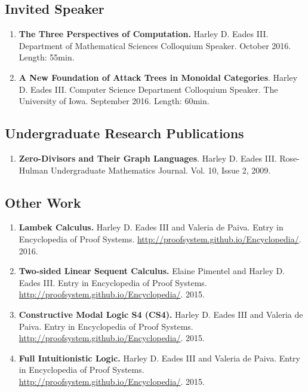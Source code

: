 \documentclass{article}
\begin{document}
    \subsection{Invited Speaker}
    \label{subsec:invited_speaker}
    \begin{enumerate}
    \item \textbf{The Three Perspectives of Computation.} Harley
      D. Eades III. Department of Mathematical Sciences Colloquium
      Speaker. October 2016. Length: 55min.
      
    \item \textbf{A New Foundation of Attack Trees in Monoidal
      Categories}. Harley D. Eades III. Computer Science Department
      Colloquium Speaker.  The University of Iowa. September
      2016. Length: 60min.      
    \end{enumerate}
    
    \subsection{Undergraduate Research Publications}
    \begin{enumerate}
      \item   \textbf{Zero-Divisors and Their Graph Languages}. Harley D. Eades III. Rose-Hulman Undergraduate 
        Mathematics Journal. Vol. 10, Issue 2, 2009. 
    \end{enumerate}

    \subsection{Other Work}
    \label{subsec:other_work}
    \begin{enumerate}
    \item \textbf{Lambek Calculus.} Harley D. Eades III and Valeria de
      Paiva. Entry in Encyclopedia of Proof
      Systems. \url{http://proofsystem.github.io/Encyclopedia/}. 2016.

    \item \textbf{Two-sided Linear Sequent Calculus.} Elaine Pimentel and Harley D. Eades III. Entry in Encyclopedia of Proof Systems. \url{http://proofsystem.github.io/Encyclopedia/}. 2015.

    \item \textbf{Constructive Modal Logic S4 (CS4).} Harley D. Eades III and Valeria de Paiva. Entry in Encyclopedia of Proof Systems. \url{http://proofsystem.github.io/Encyclopedia/}. 2015.

    \item \textbf{Full Intuitionistic Logic.} Harley D. Eades III and Valeria de Paiva. Entry in Encyclopedia of Proof Systems. \url{http://proofsystem.github.io/Encyclopedia/}. 2015.
    \end{enumerate}
\end{document}
